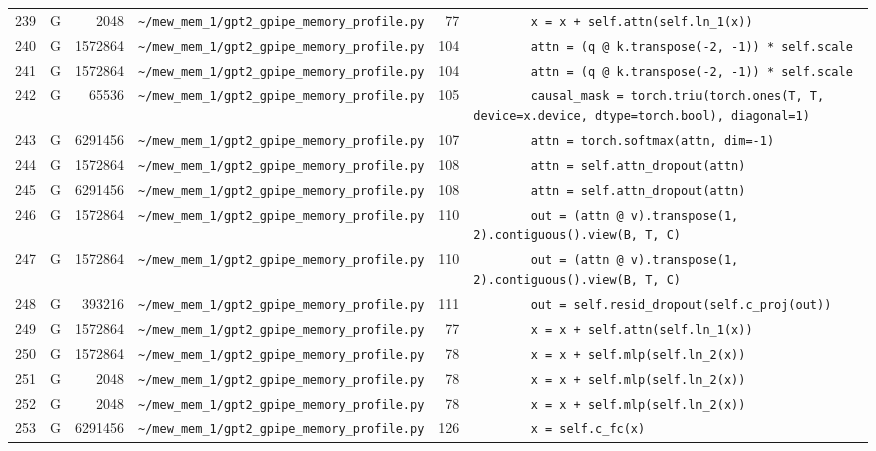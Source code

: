 \documentclass{article}
\begin{document}
\begin{longtable}{r l r p{6.5cm} r p{7.0cm}}
239 & G & 2048 & \lstinline|~/mew_mem_1/gpt2_gpipe_memory_profile.py| & 77 & \lstinline|        x = x + self.attn(self.ln_1(x))| \\
240 & G & 1572864 & \lstinline|~/mew_mem_1/gpt2_gpipe_memory_profile.py| & 104 & \lstinline|        attn = (q @ k.transpose(-2, -1)) * self.scale| \\
241 & G & 1572864 & \lstinline|~/mew_mem_1/gpt2_gpipe_memory_profile.py| & 104 & \lstinline|        attn = (q @ k.transpose(-2, -1)) * self.scale| \\
242 & G & 65536 & \lstinline|~/mew_mem_1/gpt2_gpipe_memory_profile.py| & 105 & \lstinline|        causal_mask = torch.triu(torch.ones(T, T, device=x.device, dtype=torch.bool), diagonal=1)| \\
243 & G & 6291456 & \lstinline|~/mew_mem_1/gpt2_gpipe_memory_profile.py| & 107 & \lstinline|        attn = torch.softmax(attn, dim=-1)| \\
244 & G & 1572864 & \lstinline|~/mew_mem_1/gpt2_gpipe_memory_profile.py| & 108 & \lstinline|        attn = self.attn_dropout(attn)| \\
245 & G & 6291456 & \lstinline|~/mew_mem_1/gpt2_gpipe_memory_profile.py| & 108 & \lstinline|        attn = self.attn_dropout(attn)| \\
246 & G & 1572864 & \lstinline|~/mew_mem_1/gpt2_gpipe_memory_profile.py| & 110 & \lstinline|        out = (attn @ v).transpose(1, 2).contiguous().view(B, T, C)| \\
247 & G & 1572864 & \lstinline|~/mew_mem_1/gpt2_gpipe_memory_profile.py| & 110 & \lstinline|        out = (attn @ v).transpose(1, 2).contiguous().view(B, T, C)| \\
248 & G & 393216 & \lstinline|~/mew_mem_1/gpt2_gpipe_memory_profile.py| & 111 & \lstinline|        out = self.resid_dropout(self.c_proj(out))| \\
249 & G & 1572864 & \lstinline|~/mew_mem_1/gpt2_gpipe_memory_profile.py| & 77 & \lstinline|        x = x + self.attn(self.ln_1(x))| \\
250 & G & 1572864 & \lstinline|~/mew_mem_1/gpt2_gpipe_memory_profile.py| & 78 & \lstinline|        x = x + self.mlp(self.ln_2(x))| \\
251 & G & 2048 & \lstinline|~/mew_mem_1/gpt2_gpipe_memory_profile.py| & 78 & \lstinline|        x = x + self.mlp(self.ln_2(x))| \\
252 & G & 2048 & \lstinline|~/mew_mem_1/gpt2_gpipe_memory_profile.py| & 78 & \lstinline|        x = x + self.mlp(self.ln_2(x))| \\
253 & G & 6291456 & \lstinline|~/mew_mem_1/gpt2_gpipe_memory_profile.py| & 126 & \lstinline|        x = self.c_fc(x)| \\

\end{longtable}
\end{document}
